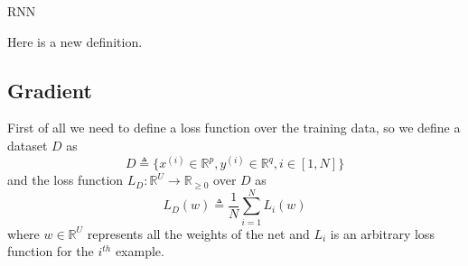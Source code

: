 \begin{defn}{RNN}

Here is a new definition.
\end{defn}
\subsection{Gradient}

First of all we need to define a loss function over the training data, so we define a dataset $D$ as 
\begin{equation}
D\triangleq\{x^{(i)} \in \mathbb{R}^p, y^{(i)} \in \mathbb{R}^q,  i\in[1,N]\}
\end{equation}
and the loss function $L_D:\mathbb{R}^U \rightarrow \mathbb{R}_{\geq 0}$ over $D$ as
\begin{equation}
L_D(w)\triangleq\frac{1}{N}\sum_{i=1}^N L_i(w) 
\end{equation}
where $w\in \mathbb{R}^U$ represents all the weights of the net and $L_i$ is an arbitrary loss function for the $i^{th}$ example.

